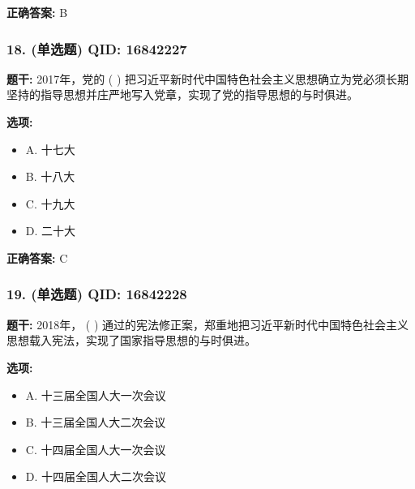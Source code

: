 \documentclass[12pt,UTF8]{ctexart}
\begin{document}
\textbf{正确答案:}
B

\vspace{0.3em}\hrulefill\vspace{0.7em}

\subsubsection*{18. (单选题) \small QID: 16842227}

\textbf{题干:}
2017年，党的 ( ) 把习近平新时代中国特色社会主义思想确立为党必须长期坚持的指导思想并庄严地写入党章，实现了党的指导思想的与时俱进。

\textbf{选项:}
\begin{itemize}[leftmargin=*]

  \item A. 十七大

  \item B. 十八大

  \item C. 十九大

  \item D. 二十大

\end{itemize}

\textbf{正确答案:}
C

\vspace{0.3em}\hrulefill\vspace{0.7em}

\subsubsection*{19. (单选题) \small QID: 16842228}

\textbf{题干:}
2018年， ( ) 通过的宪法修正案，郑重地把习近平新时代中国特色社会主义思想载入宪法，实现了国家指导思想的与时俱进。

\textbf{选项:}
\begin{itemize}[leftmargin=*]

  \item A. 十三届全国人大一次会议

  \item B. 十三届全国人大二次会议

  \item C. 十四届全国人大一次会议

  \item D. 十四届全国人大二次会议

\end{itemize}
\end{document}
